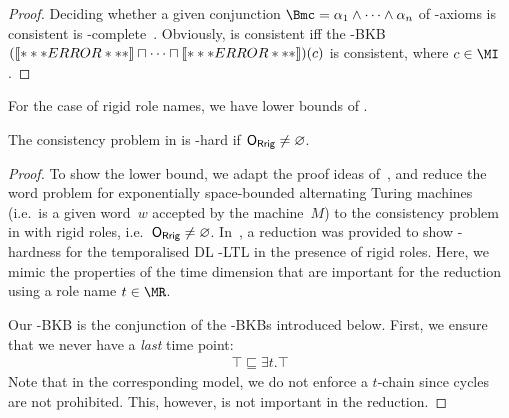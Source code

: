 \begin{proof}
  Deciding whether a given conjunction $\Bmc = \alpha_{1} \land \dots \land \alpha_{n}$ of \ALCOIQ-axioms
  is consistent is \NExpTime-complete~\cite{Tob-JAIR00}.  Obviously, \Bmc is consistent iff the \ELSHOIQ-BKB
  $(\oax{\alpha_{1}} \sqcap \dots \sqcap \oax{\alpha_{n}})(c)$ is consistent, where $c\in\MI$.
\end{proof}

\noindent
For the case of rigid role names, we have lower bounds of \TwoExpTime.

\begin{theorem}\label{thm:elalc-2exp-hard-rigid-roles}
  The consistency problem in \ELALC is \TwoExpTime-hard if $\ORR \neq \emptyset$.
\end{theorem}

\begin{proof}
  To show the lower bound, we adapt the proof ideas of~\cite{BaGL-KR08,BaGL-ToCL12}, and reduce the
  word problem for exponentially space-bounded alternating Turing machines (i.e.~is a given word~$w$
  accepted by the machine~$M$) to the consistency problem in \ELALC with rigid roles,
  i.e.~$\ORR\ne\emptyset$.
  In~\cite{BaGL-KR08,BaGL-ToCL12}, a reduction was provided to show \TwoExpTime-hardness for the
  temporalised DL \ALC-LTL in the presence of rigid roles.
  Here, we mimic the properties of the time dimension that are important for the reduction using a
  role name $t\in\MR$.

  Our \ELALC-BKB is the conjunction of the \ELALC-BKBs introduced below.
  First, we ensure that we never have a \emph{last} time point:
  \begin{gather*}
    \top\sqsubseteq\exists t.\top
  \end{gather*}
  Note that in the corresponding model, we do not enforce a $t$-chain since cycles are not
  prohibited.  This, however, is not important in the reduction.


\end{proof}
